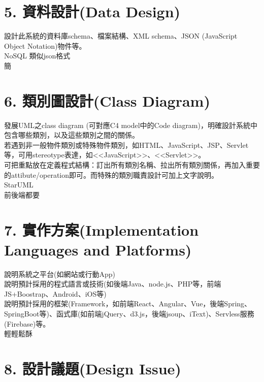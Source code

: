 \documentclass{report}
\begin{document}
\section*{5. 資料設計(Data Design)}

\begin{obeylines}
\parindent=0pt
設計此系統的資料庫schema、檔案結構、XML schema、JSON (JavaScript Object Notation)物件等。
NoSQL 類似json格式
簡
\end{obeylines}

\section*{6. 類別圖設計(Class Diagram)}

\begin{obeylines}
\parindent=0pt
發展UML之class diagram (可對應C4 model中的Code diagram)，明確設計系統中包含哪些類別，以及這些類別之間的關係。
若遇到非一般物件類別或特殊物件類別，如HTML、JavaScript、JSP、Servlet等，可用stereotype表達，如<<JavaScript>>、<<Servlet>>。
可把重點放在定義程式結構：訂出所有類別名稱、拉出所有類別關係，再加入重要的attibute/operation即可。而特殊的類別職責設計可加上文字說明。
	StarUML
	前後端都要
\end{obeylines}

\section*{7. 實作方案(Implementation Languages and Platforms)}

\begin{obeylines}
\parindent=0pt
說明系統之平台(如網站或行動App)
說明預計採用的程式語言或技術(如後端Java、node.js、PHP等，前端JS+Boostrap、Android、iOS等)
說明預計採用的框架(Framework，如前端React、Angular、Vue，後端Spring、SpringBoot等)、函式庫(如前端jQuery、d3.js，後端jsoup、iText)、Servless服務(Firebase)等。
輕輕鬆酥
\end{obeylines}

\section*{8. 設計議題(Design Issue)}
\end{document}

